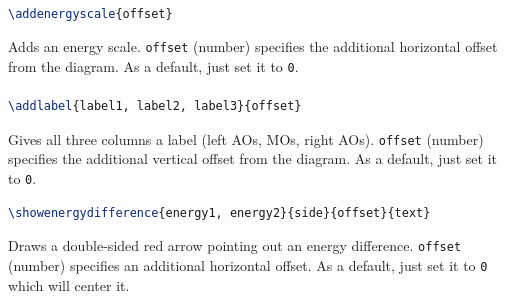 \documentclass[12pt, a4paper]{article}
\begin{document}
\paragraph{}

\begin{lstlisting}[language=TeX]
\addenergyscale{offset}
\end{lstlisting}
Adds an energy scale. \texttt{offset} (number) specifies the additional horizontal offset from the diagram. As a default, just set it to \texttt{0}.
{\color{red}{This macro has to be executed after each orbital is drawn. Otherwise the scale's size and position will be calculated incorrect.}}

\paragraph{}

\begin{lstlisting}[language=TeX]
\addlabel{label1, label2, label3}{offset}
\end{lstlisting}
Gives all three columns a label (left AOs, MOs, right AOs). \texttt{offset} (number) specifies the additional vertical offset from the diagram. As a default, just set it to \texttt{0}.
{\color{red}{This macro has to be executed after each orbital is drawn. Otherwise the vertical position will be calculated incorrect.}}

\begin{figure}[H]
    \centering
    \begin{mohelper}
        \def\columndistance{3}
        \def\diagrammode{normal}
    \end{mohelper}
    \label{fig:modiagram4}
\end{figure}

\begin{lstlisting}[language=TeX]
\showenergydifference{energy1, energy2}{side}{offset}{text}
\end{lstlisting}

\noindent Draws a double-sided red arrow pointing out an energy difference. \texttt{offset} (number) specifies an additional horizontal offset. As a default, just set it to \texttt{0} which will center it.
\end{document}
